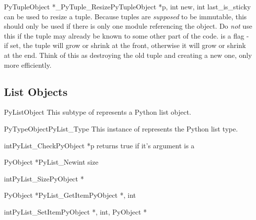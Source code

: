 \documentclass[twoside,openright]{report}
\begin{document}
\begin{cfuncdesc}{PyTupleObject *}{_PyTuple_Resize}{PyTupleObject *p,
            int new,
            int last_is_sticky}
can be used to resize a tuple. Because tuples are
\emph{supposed} to be immutable, this should only be used if there is only
one module referencing the object. Do \emph{not} use this if the tuple may
already be known to some other part of the code.  is
a flag - if set, the tuple will grow or shrink at the front, otherwise
it will grow or shrink at the end. Think of this as destroying the old
tuple and creating a new one, only more efficiently.
\end{cfuncdesc}


\subsection{List Objects}

\begin{ctypedesc}{PyListObject}
This subtype of  represents a Python list object.
\end{ctypedesc}

\begin{cvardesc}{PyTypeObject}{PyList_Type}
This instance of  represents the Python list type.
\end{cvardesc}

\begin{cfuncdesc}{int}{PyList_Check}{PyObject *p}
returns true if it's argument is a 
\end{cfuncdesc}

\begin{cfuncdesc}{PyObject *}{PyList_New}{int size}

\end{cfuncdesc}

\begin{cfuncdesc}{int}{PyList_Size}{PyObject *}

\end{cfuncdesc}

\begin{cfuncdesc}{PyObject *}{PyList_GetItem}{PyObject *, int}

\end{cfuncdesc}

\begin{cfuncdesc}{int}{PyList_SetItem}{PyObject *, int, PyObject *}

\end{cfuncdesc}
\end{document}
